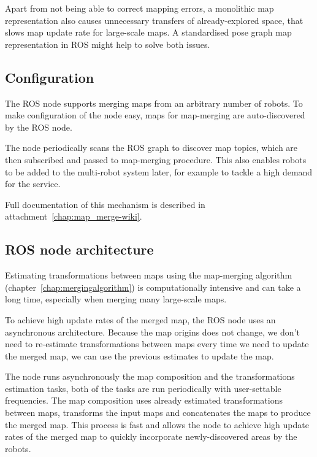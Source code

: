 Apart from not being able to correct mapping errors, a monolithic map representation also causes unnecessary transfers of already-explored space, that slows map update rate for large-scale maps. A standardised pose graph map representation in \gls{ROS} might help to solve both issues.


\subsection{Configuration}
\label{sec:configuration}

The \gls{ROS} node supports merging maps from an arbitrary number of robots. To make configuration of the node easy, maps for map-merging are auto-discovered by the \gls{ROS} node.

The node periodically scans the \gls{ROS} graph to discover map topics, which are then subscribed and passed to map-merging procedure. This also enables robots to be added to the multi-robot system later, for example to tackle a high demand for the service.

Full documentation of this mechanism is described in attachment~\ref{chap:map_merge-wiki}.

\subsection{ROS node architecture}
\label{sec:node-architecture}

Estimating transformations between maps using the map-merging algorithm (chapter~\ref{chap:mergingalgorithm}) is computationally intensive and can take a long time, especially when merging many large-scale maps.

To achieve high update rates of the merged map, the \gls{ROS} node uses an asynchronous architecture. Because the map origins does not change, we don't need to re-estimate transformations between maps every time we need to update the merged map, we can use the previous estimates to update the map.

The node runs asynchronously the map composition and the transformations estimation tasks, both of the tasks are run periodically with user-settable frequencies. The map composition uses already estimated transformations between maps, transforms the input maps and concatenates the maps to produce the merged map. This process is fast and allows the node to achieve high update rates of the merged map to quickly incorporate newly-discovered areas by the robots.

